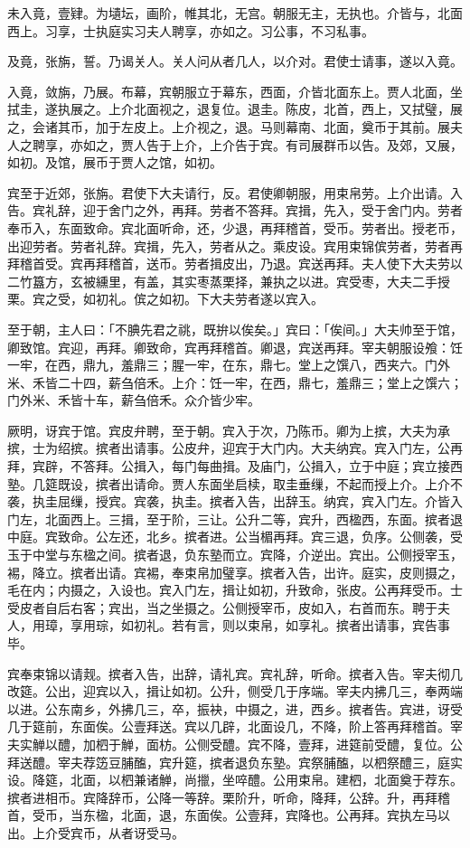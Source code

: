\documentclass[]{article}
\begin{document}
未入竟，壹肄。为壝坛，画阶，帷其北，无宫。朝服无主，无执也。介皆与，北面西上。习享，士执庭实习夫人聘享，亦如之。习公事，不习私事。

及竟，张旃，誓。乃谒关人。关人问从者几人，以介对。君使士请事，遂以入竟。

入竟，敛旃，乃展。布幕，宾朝服立于幕东，西面，介皆北面东上。贾人北面，坐拭圭，遂执展之。上介北面视之，退复位。退圭。陈皮，北首，西上，又拭璧，展之，会诸其币，加于左皮上。上介视之，退。马则幕南、北面，奠币于其前。展夫人之聘享，亦如之，贾人告于上介，上介告于宾。有司展群币以告。及郊，又展，如初。及馆，展币于贾人之馆，如初。

宾至于近郊，张旃。君使下大夫请行，反。君使卿朝服，用束帛劳。上介出请。入告。宾礼辞，迎于舍门之外，再拜。劳者不答拜。宾揖，先入，受于舍门内。劳者奉币入，东面致命。宾北面听命，还，少退，再拜稽首，受币。劳者出。授老币，出迎劳者。劳者礼辞。宾揖，先入，劳者从之。乘皮设。宾用束锦傧劳者，劳者再拜稽首受。宾再拜稽首，送币。劳者揖皮出，乃退。宾送再拜。夫人使下大夫劳以二竹簋方，玄被纁里，有盖，其实枣蒸栗择，兼执之以进。宾受枣，大夫二手授栗。宾之受，如初礼。傧之如初。下大夫劳者遂以宾入。

至于朝，主人曰：「不腆先君之祧，既拚以俟矣。」宾曰：「俟间。」大夫帅至于馆，卿致馆。宾迎，再拜。卿致命，宾再拜稽首。卿退，宾送再拜。宰夫朝服设飧：饪一牢，在西，鼎九，羞鼎三；腥一牢，在东，鼎七。堂上之馔八，西夹六。门外米、禾皆二十四，薪刍倍禾。上介：饪一牢，在西，鼎七，羞鼎三；堂上之馔六；门外米、禾皆十车，薪刍倍禾。众介皆少牢。

厥明，讶宾于馆。宾皮弁聘，至于朝。宾入于次，乃陈币。卿为上摈，大夫为承摈，士为绍摈。摈者出请事。公皮弁，迎宾于大门内。大夫纳宾。宾入门左，公再拜，宾辟，不答拜。公揖入，每门每曲揖。及庙门，公揖入，立于中庭；宾立接西塾。几筵既设，摈者出请命。贾人东面坐启椟，取圭垂缫，不起而授上介。上介不袭，执圭屈缫，授宾。宾袭，执圭。摈者入告，出辞玉。纳宾，宾入门左。介皆入门左，北面西上。三揖，至于阶，三让。公升二等，宾升，西楹西，东面。摈者退中庭。宾致命。公左还，北乡。摈者进。公当楣再拜。宾三退，负序。公侧袭，受玉于中堂与东楹之间。摈者退，负东塾而立。宾降，介逆出。宾出。公侧授宰玉，裼，降立。摈者出请。宾裼，奉束帛加璧享。摈者入告，出许。庭实，皮则摄之，毛在内；内摄之，入设也。宾入门左，揖让如初，升致命，张皮。公再拜受币。士受皮者自后右客；宾出，当之坐摄之。公侧授宰币，皮如入，右首而东。聘于夫人，用璋，享用琮，如初礼。若有言，则以束帛，如享礼。摈者出请事，宾告事毕。

宾奉束锦以请觌。摈者入告，出辞，请礼宾。宾礼辞，听命。摈者入告。宰夫彻几改筵。公出，迎宾以入，揖让如初。公升，侧受几于序端。宰夫内拂几三，奉两端以进。公东南乡，外拂几三，卒，振袂，中摄之，进，西乡。摈者告。宾进，讶受几于筵前，东面俟。公壹拜送。宾以几辟，北面设几，不降，阶上答再拜稽首。宰夫实觯以醴，加柶于觯，面枋。公侧受醴。宾不降，壹拜，进筵前受醴，复位。公拜送醴。宰夫荐笾豆脯醢，宾升筵，摈者退负东塾。宾祭脯醢，以柶祭醴三，庭实设。降筵，北面，以柶兼诸觯，尚擸，坐啐醴。公用束帛。建柶，北面奠于荐东。摈者进相币。宾降辞币，公降一等辞。栗阶升，听命，降拜，公辞。升，再拜稽首，受币，当东楹，北面，退，东面俟。公壹拜，宾降也。公再拜。宾执左马以出。上介受宾币，从者讶受马。
\end{document}
